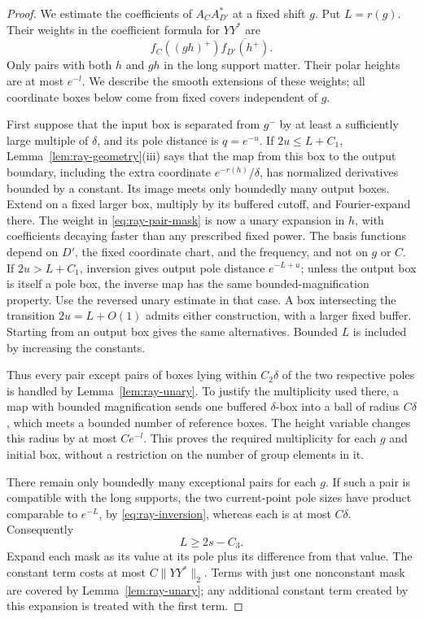 \begin{proof}
We estimate the coefficients of \(A_CA_{D'}^*\) at a fixed shift \(g\).
Put \(L=r(g)\).  Their weights in the coefficient formula for \(YY^*\)
are
\begin{equation}\label{eq:ray-pair-mask}
             f_C((gh)^+)\overline{f_{D'}(h^+)}.
\end{equation}
Only pairs with both \(h\) and \(gh\) in the long support matter.
Their polar heights are at most \(e^{-l}\).  We describe the smooth
extensions of these weights; all coordinate boxes below come from
fixed covers independent of \(g\).

First suppose that the input box is separated from \(g^-\) by at
least a sufficiently large multiple of \(\delta\), and its pole
distance is \(q=e^{-u}\).  If \(2u\le L+C_1\),
Lemma~\ref{lem:ray-geometry}(iii) says that the map from this
box to the output boundary, including the extra coordinate
\(e^{-r(h)}/\delta\), has normalized derivatives bounded by a constant.
Its image meets only boundedly many output boxes.  Extend on a fixed
larger box, multiply by its buffered cutoff, and Fourier-expand there.
The weight in \eqref{eq:ray-pair-mask} is now a unary expansion
in \(h\), with coefficients decaying faster than any prescribed fixed
power.  The basis functions depend on \(D'\), the fixed coordinate
chart, and the frequency, and not on \(g\) or \(C\).  If
\(2u>L+C_1\), inversion gives output pole distance
\(e^{-L+u}\); unless the output box is itself a pole box, the inverse
map has the same bounded-magnification property.  Use the reversed
unary estimate in that case.  A box intersecting the transition
\(2u=L+O(1)\) admits either construction, with a larger fixed buffer.
Starting from an output box gives the same alternatives.  Bounded
\(L\) is included by increasing the constants.

Thus every pair except pairs of boxes lying within \(C_2\delta\)
of the two respective poles is handled by
Lemma~\ref{lem:ray-unary}.  To justify the multiplicity used
there, a map with bounded magnification sends one buffered
\(\delta\)-box into a ball of radius \(C\delta\), which meets a
bounded number of reference boxes.  The height variable changes this
radius by at most \(Ce^{-l}\).  This proves the required multiplicity
for each \(g\) and initial box, without a restriction on the number of
group elements in it.

There remain only boundedly many exceptional pairs for each \(g\).
If such a pair is compatible with the long supports, the two
current-point pole sizes have product comparable to \(e^{-L}\), by
\eqref{eq:ray-inversion}, whereas each is at most
\(C\delta\).  Consequently
\begin{equation}\label{eq:ray-long-shift}
                         L\ge2s-C_3.
\end{equation}
Expand each mask as its value at its pole plus its difference from
that value.  The constant term costs at most
\(C\|YY^*\|_2\).  Terms with just one nonconstant mask are covered
by Lemma~\ref{lem:ray-unary}; any additional constant term
created by this expansion is treated with the first term.


\end{proof}
